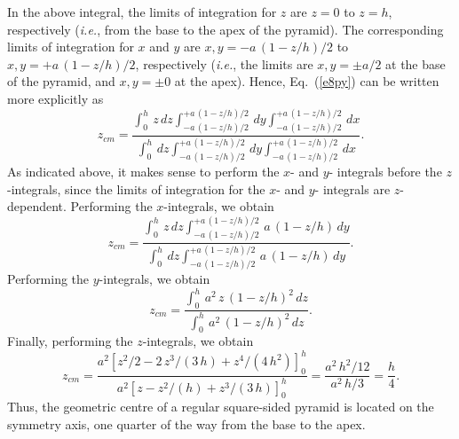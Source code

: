In the above integral, the limits of integration for $z$ are $z=0$ to $z=h$, respectively
({\em i.e.}, from the base  to the apex of the pyramid). 
The corresponding limits of integration for $x$ and $y$ are $x,y=-a\,(1-z/h)/2$ to
$x,y=+a\,(1-z/h)/2$, respectively ({\em i.e.}, the limits are $x,y=\pm a/2$ at the
base of the pyramid, and $x,y=\pm 0$ at the apex). Hence, Eq.~(\ref{e8py}) can
be written more explicitly as
\begin{equation}
z_{cm} = \frac{\int_0^h\,z\,dz\!\int_{-a\,(1-z/h)/2}^{+a\,(1-z/h)/2}\,dy\!
\int_{-a\,(1-z/h)/2}^{+a\,(1-z/h)/2}\,dx}{\int_0^h\,dz\!\int_{-a\,(1-z/h)/2}^{+a\,(1-z/h)/2}\,dy\!
\int_{-a\,(1-z/h)/2}^{+a\,(1-z/h)/2}\,dx}.
\end{equation}
As indicated above, it makes sense to perform the $x$- and $y$- integrals before the $z$-integrals,
since the limits of integration for the $x$- and $y$- integrals are $z$-dependent.
Performing the $x$-integrals, we obtain
\begin{equation}
z_{cm} = \frac{\int_0^h\,z\,dz\!\int_{-a\,(1-z/h)/2}^{+a\,(1-z/h)/2}\,a\,(1-z/h)\,dy}{\int_0^h\,dz\!\int_{-a\,(1-z/h)/2}^{+a\,(1-z/h)/2}\,
a\,(1-z/h)\,dy}.
\end{equation}
Performing the $y$-integrals, we obtain
\begin{equation}
z_{cm} = \frac{\int_0^h\,a^2\,z\,(1-z/h)^2\,dz}{\int_0^h\,a^2\,(1-z/h)^2\,dz}.
\end{equation}
Finally, performing the $z$-integrals, we obtain
\begin{equation}
z_{cm} = \frac{ a^2\left[z^2/2 - 2\,z^3/(3\,h) + z^4/(4\,h^2)\right]_0^h}
{a^2\left[z - z^2/(h) + z^3/(3\,h)\right]_0^h} = \frac{a^2\,h^2/12}{a^2\,h/3} = \frac{h}{4}.
\end{equation}
Thus, the geometric centre of a regular square-sided pyramid is located on the 
symmetry axis, one quarter of the way from the base to the apex.

